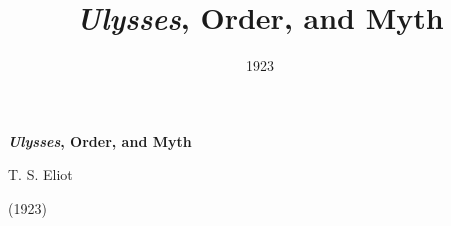 \title{\emph{Ulysses}, Order, and Myth}
\author{}
\date{1923}


\renewcommand{\chaptername}{Eliot, \emph{Ulysses}, Order, and Myth}

\thispagestyle{plain}


\begin{raggedright}
{\Large \linespread{1.0} \noindent \textbf{\emph{Ulysses}, Order, and Myth} \par} 

{\large T. S. Eliot \par} 

\vspace{0.5em}
\end{raggedright}

\begin{raggedleft}
{\large \linespread{1.2} (1923) \par}
\end{raggedleft}
\vspace{1em}








